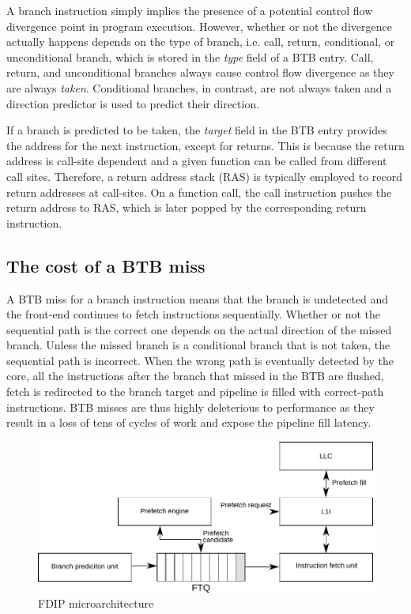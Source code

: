 A branch instruction simply implies the presence of a potential control flow divergence point in program execution. However, whether or not the divergence actually happens depends on the type of branch, i.e. call, return, conditional, or unconditional branch, which is stored in the \textit{type} field of a BTB entry. Call, return, and unconditional branches always cause control flow divergence as they are always \textit{taken}. Conditional branches, in contrast, are not always taken and a direction predictor is used to predict their direction. 

If a branch is predicted to be taken, the \textit{target} field in the BTB entry provides the address for the next instruction, except for returns. This is because the return address is call-site dependent and a given function can be called from different call sites. Therefore, a return address stack (RAS) is typically employed to record return addresses at call-sites. On a function call, the call instruction pushes the return address to RAS, which is later popped by the corresponding return instruction.

\subsection{The cost of a BTB miss}
A BTB miss for a branch instruction means that the branch is undetected and the front-end continues to fetch instructions sequentially. Whether or not the sequential path is the correct one depends on the actual direction of the missed branch. Unless the missed branch is a conditional branch that is not taken, the sequential path is incorrect. When the wrong path is eventually detected by the core, all the instructions after the branch that missed in the BTB are flushed, fetch is redirected to the branch target and pipeline is filled with correct-path instructions. BTB misses are thus highly deleterious to performance as they result in a loss of tens of cycles of work and expose the pipeline fill latency. 

\begin{figure}
\centering
\includegraphics[width=.9\columnwidth, trim=0 0 0 0, clip]{figures/fdip1.pdf}
\caption{FDIP microarchitecture}
\label{fig:fdip}
\end{figure}


